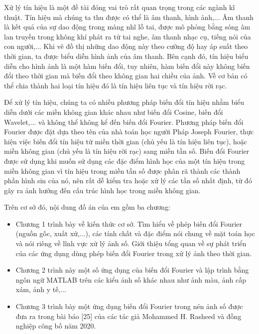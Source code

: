 \par Xử lý tín hiệu là một đề tài đóng vai trò rất quan trọng trong các ngành kĩ thuật. Tín hiệu mà chúng ta thu được có thể là âm thanh, hình ảnh,... Âm thanh là kết quả của sự dao động trong màng nhĩ lỗ tai, được mô phỏng bằng sóng âm lan truyền trong không khí phát ra từ tai nghe, âm thanh nhạc cụ, tiếng nói của con người,... Khi vẽ đồ thị những dao động này theo cường độ hay áp suất theo thời gian, ta được biểu diễn hình ảnh của âm thanh. Bên cạnh đó, tín hiệu biểu diễn cho hình ảnh là một hàm biến đổi, tuy nhiên, hàm biến đổi này không biến đổi theo thời gian mà biến đổi theo không gian hai chiều của ảnh. Về cơ bản có thể chia thành hai loại tín hiệu đó là tín hiệu liên tục và tín hiệu rời rạc. 
\par Để xử lý tín hiệu, chúng ta có nhiều phương pháp biến đổi tín hiệu nhằm biểu diễn dưới các miền không gian khác nhau như biến đổi Cosine, biến đổi Wavelet,... và không thể không kể đến biến đổi Fourier. Phương pháp biến đổi Fourier được đặt dựa theo tên của nhà toán học người Pháp Joseph Fourier, thực hiện việc biến đổi tín hiệu từ miền thời gian (chủ yếu là tín hiệu liên tục), hoặc miền không gian (chủ yếu là tín hiệu rời rạc) sang miền tần số. Biến đổi Fourier được sử dụng khi muốn sử dụng các đặc điểm hình học của một tín hiệu trong miền không gian vì tín hiệu trong miền tần số được phân rã thành các thành phần hình sin của nó, nên rất dễ kiểm tra hoặc xử lý các tần số nhất định, từ đó gây ra ảnh hưởng đến cấu trúc hình học trong miền không gian.
\par Trên cơ sở đó, nội dung đồ án của em gồm ba chương:
\begin{itemize}
    \item Chương 1 trình bày về kiến thức cơ sở. Tìm hiểu về phép biến đổi Fourier (nguồn gốc, xuất xứ,...), các tính chất và đặc điểm nói chung về mặt toán học và nói riêng về lĩnh vực xử lý ảnh số. Giới thiệu tổng quan về sự phát triển của các ứng dụng dùng phép biến đổi Fourier trong xử lý ảnh theo thời gian.
    \item Chương 2 trình này một số ứng dụng của biến đổi Fourier và lập trình bằng ngôn ngữ MATLAB trên các kiểu ảnh số khác nhau như ảnh màu, ảnh cấp xám, ảnh y tế,...
    \item Chương 3 trình bày một ứng dụng biến đổi Fourier trong nén ảnh số được đưa ra trong bài báo [25] của các tác giả Mohammed H. Rasheed và đồng nghiệp công bố năm 2020.
\end{itemize}
